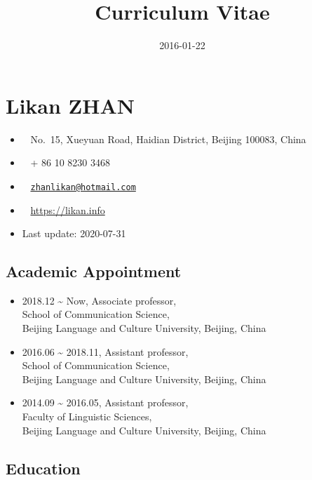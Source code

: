 \documentclass[
  12pt,
]{article}
\title{Curriculum Vitae}
\author{}
\date{2016-01-22}
\providecommand{\tightlist}{%
  \setlength{\itemsep}{0pt}\setlength{\parskip}{0pt}}
\begin{document}
\maketitle

\hypertarget{likan-zhan}{%
\section{Likan ZHAN}\label{likan-zhan}}

\begin{itemize}
\tightlist
\item
  \faUniversity  ~ No.~15, Xueyuan Road, Haidian District, Beijing
  100083, China
\item
  \faPhone*  ~ + 86 10 8230 3468
\item
  \faEnvelope[regular]  ~
  \href{mailto:zhanlikan@hotmail.com}{\nolinkurl{zhanlikan@hotmail.com}}
\item
  \faGlobe  ~ \url{https://likan.info}
\item
  Last update: 2020-07-31
\end{itemize}

\hypertarget{academic-appointment}{%
\subsection{Academic Appointment}\label{academic-appointment}}

\begin{itemize}
\item
  2018.12 \textasciitilde{} Now, Associate professor,\\
  School of Communication Science,\\
  Beijing Language and Culture University, Beijing, China
\item
  2016.06 \textasciitilde{} 2018.11, Assistant professor,\\
  School of Communication Science,\\
  Beijing Language and Culture University, Beijing, China
\item
  2014.09 \textasciitilde{} 2016.05, Assistant professor,\\
  Faculty of Linguistic Sciences,\\
  Beijing Language and Culture University, Beijing, China
\end{itemize}

\hypertarget{education}{%
\subsection{Education}\label{education}}
\end{document}
